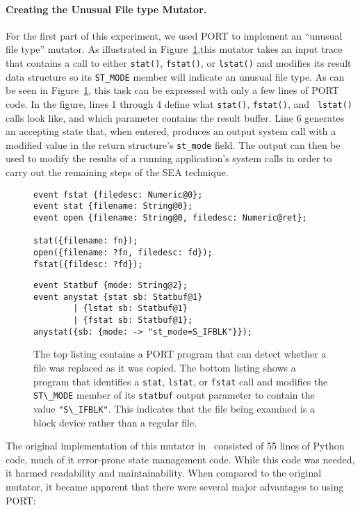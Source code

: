 \paragraph{Creating the Unusual File type Mutator.}
\label{subsub:UnusualFiletype}
For the first part of this experiment,
we used PORT to implement an ``unusual file type''
mutator.
As illustrated in Figure~\ref{lst:SEAListings},this mutator
takes an input trace
that contains a call to either {\tt stat()},
{\tt fstat()},
or {\tt lstat()}
and modifies its result data structure so
its {\tt ST\_MODE} member will indicate an unusual file type.
As can be seen in
Figure~\ref{lst:SEAListings}, this task can be expressed with only a few lines of PORT code.  In the figure,
lines 1 through 4 define what {\tt stat()}, {\tt fstat()}, and {\tt
lstat()} calls look like, and which parameter contains the result buffer.
Line 6 generates an accepting state that, when entered, produces an output
system call with a modified value in the return structure's {\tt st\_mode}
field.  The output can then be used to modify the results of a running
application's system calls in order to carry out the remaining steps of the
SEA technique.

\begin{figure}
\centering
\begin{lstlisting}[basicstyle=\ttfamily\scriptsize]
event fstat {filedesc: Numeric@0};
event stat {filename: String@0};
event open {filename: String@0, filedesc: Numeric@ret};

stat({filename: fn});
open({filename: ?fn, filedesc: fd});
fstat({fildesc: ?fd});
\end{lstlisting}
\begin{lstlisting}[basicstyle=\ttfamily\scriptsize]
event Statbuf {mode: String@2};
event anystat {stat sb: Statbuf@1}
        | {lstat sb: Statbuf@1}
        | {fstat sb: Statbuf@1};
anystat({sb: {mode: -> "st_mode=S_IFBLK"}});
\end{lstlisting}
\caption{The top listing contains a
PORT program that can detect whether a file was replaced as it was copied.
The bottom listing shows a program that
identifies a \texttt{stat}, \texttt{lstat}, or \texttt{fstat} call and modifies
  the \lstinline+ST\_MODE+ member of its \lstinline+statbuf+ output parameter to contain the value
  \lstinline+"S\_IFBLK"+. This indicates that the file being examined is a block device rather than a regular file.}
\label{lst:SEAListings}
\end{figure}

The original implementation of this mutator in~\cite{DBLP:conf/issre/MooreCFW19} consisted of 55 lines
of Python code, much of it error-prone state management code. While this code was needed, it harmed
readability and maintainability.
When compared to the original mutator, it became apparent that there were
several major advantages
to using
PORT:

